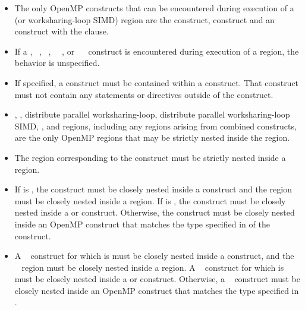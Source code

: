 \begin{itemize}
\item The only OpenMP constructs that can be encountered during execution of a
   (or worksharing-loop SIMD) region are the  construct,
   construct and an  construct with the  clause.

\item If a , ~,
~, ~~, or
~~ construct is encountered during
execution of a  region, the behavior is unspecified.

\item If specified, a  construct must be contained within a  construct. That
 construct must not contain any statements or directives outside of the 
construct.

\item {}, , distribute parallel
    worksharing-loop,
  distribute parallel worksharing-loop SIMD, , and  regions, including any
 regions arising from combined constructs, are the only OpenMP regions
that may be strictly nested inside the  region.

\item The region corresponding to the  construct must be
strictly nested inside a  region.

\item If  is , the 
construct must be closely nested inside a  construct and the
 region must be closely nested inside a  region. If
 is , the  construct
must be closely nested inside a  or  construct.
Otherwise, the  construct must be closely
nested inside an OpenMP construct that matches the type specified in
 of the  construct.

\item A ~ construct for which
 is  must be closely nested
inside a  construct, and the ~
region must be closely nested inside a  region. A
~ construct for which
 is  must be closely nested
inside a  or  construct. Otherwise, a
~ construct must be closely nested inside
an OpenMP construct that matches the type specified in
.


\end{itemize}

